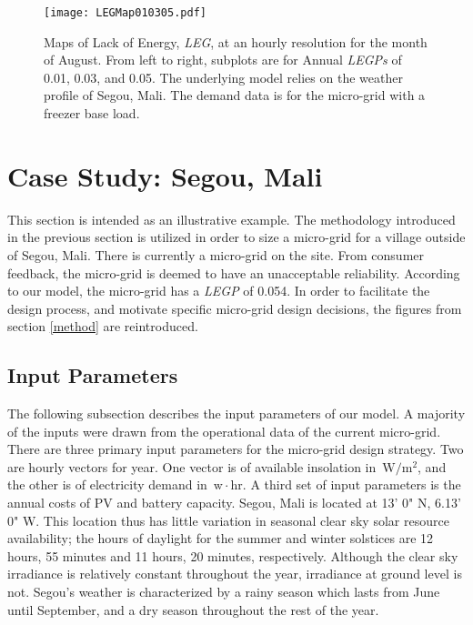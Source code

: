 \documentclass[11p]{article}
\newcommand{\unit}[1]{\ensuremath{\, \mathrm{#1}}}
\begin{document}

\begin{figure}[ht] 
  \centering
    \texttt{[image: LEGMap010305.pdf]}
  \caption{Maps of Lack of Energy, \emph{LEG}, at an hourly resolution for the month of August.
   From left to right, subplots are for Annual \emph{LEGPs} of 0.01, 0.03, and 0.05. 
  The underlying model relies on the weather profile of Segou, Mali.
  The demand data is for the micro-grid with a freezer base load.}
\label{LEGMaps}
\end{figure}


\section{Case Study: Segou, Mali} \label{CaseStudy}


This section is intended as an illustrative example.
The methodology introduced in the previous section is utilized in order to size a micro-grid for a village outside of Segou, Mali.
There is currently a micro-grid on the site. 
From consumer feedback, the micro-grid is deemed to have an unacceptable reliability.
According to our model, the micro-grid has a \emph{LEGP} of 0.054.
In order to facilitate the design process, and motivate specific micro-grid design decisions, the figures from section \ref{method} are reintroduced.

\subsection{Input Parameters}

The following subsection describes the input parameters of our model.
A majority of the inputs were drawn from the operational data of the current micro-grid. 
There are three primary input parameters for the micro-grid design strategy. 
Two are hourly vectors for year. One vector is of available insolation in \unit{W/m^2}, and the other is of electricity demand in \unit{w\! \cdot \! hr}.
A third set of input parameters is the annual costs of PV and battery capacity. 
%
%
Segou, Mali is located at 13' 0" N, 6.13' 0" W. 
This location thus has little variation in seasonal clear sky solar resource availability; the hours of daylight for the summer and winter solstices are 12 hours, 55 minutes and 11 hours, 20 minutes, respectively.  
Although the clear sky irradiance is relatively constant throughout the year, irradiance at ground level is not.
Segou's weather is characterized by a rainy season which lasts from June until September, and a dry season throughout the rest of the year. 
\end{document}
